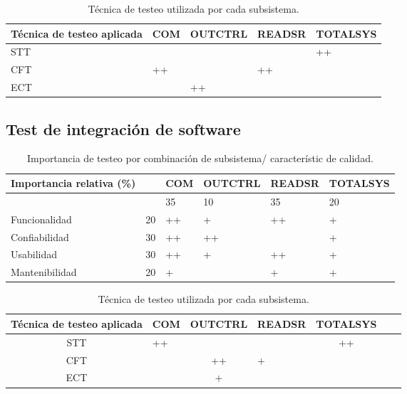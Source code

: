 \documentclass[12pt]{article}
\begin{document}
\begin{table}[ht]
    \centering
    \begin{tabular}{|l|l|l|l|l|}\hline \hline
    \rowcolor[HTML]{d6c6c3}
 Técnica de testeo aplicada & COM & OUTCTRL & READSR & TOTALSYS\\
        \hline
       STT & & & & ++ \\
      CFT & ++ & & ++& \\
      ECT & & ++ & &  \\
        \hline
    \end{tabular}
    \caption{Técnica de testeo utilizada por cada subsistema.}
\end{table}


\subsection{Test de integración de software}
\begin{table}[ht]
    \centering
    \begin{tabular}{|l|l|l|l|l|l|}\hline \hline
    \rowcolor[HTML]{d6c6c3}
 Importancia relativa (\%)& &  COM & OUTCTRL & READSR & TOTALSYS\\
        \hline
       
            &  &35 & 10 &35 & 20                          \\
        Funcionalidad    & 20 & ++ & + & ++ & +		\\
        Confiabilidad    & 30 & ++ & ++ & & +                        \\
        Usabilidad       & 30 & ++ & + & ++ & +                        \\
        Mantenibilidad   & 20 & + & & + & +                        \\
        \hline
    \end{tabular}
    \caption{Importancia de testeo por combinación de subsistema/ característic de calidad.}
\end{table}


\begin{table}[ht]
    \centering
    \begin{tabularx}{\linewidth}{@{}|c|X|c|X|c|X|c|@{}}\hline \hline
    \rowcolor[HTML]{d6c6c3}
 Técnica de testeo aplicada & COM & OUTCTRL & READSR & TOTALSYS\\
        \hline
       STT & ++ & & & ++ \\
      CFT & & ++ & + & \\
      ECT & & + & &  \\
        \hline
    \end{tabularx}
    \caption{Técnica de testeo utilizada por cada subsistema.}
\end{table}
\end{document}
